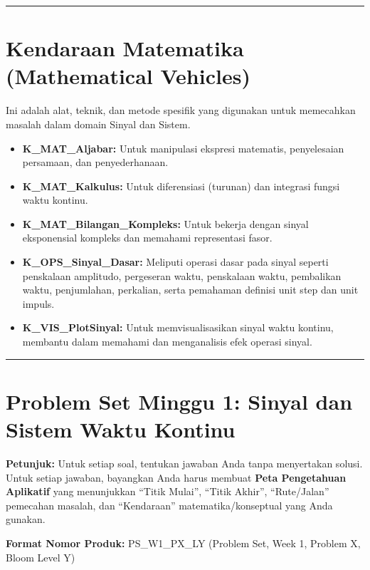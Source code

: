 \documentclass[
  letterpaper,
  DIV=11,
  numbers=noendperiod]{scrreprt}
\providecommand{\tightlist}{%
  \setlength{\itemsep}{0pt}\setlength{\parskip}{0pt}}
\begin{document}
\begin{center}\rule{0.5\linewidth}{0.5pt}\end{center}

\section{Kendaraan Matematika (Mathematical
Vehicles)}\label{kendaraan-matematika-mathematical-vehicles}

Ini adalah alat, teknik, dan metode spesifik yang digunakan untuk
memecahkan masalah dalam domain Sinyal dan Sistem.

\begin{itemize}
\tightlist
\item
  \textbf{K\_MAT\_Aljabar:} Untuk manipulasi ekspresi matematis,
  penyelesaian persamaan, dan penyederhanaan.
\item
  \textbf{K\_MAT\_Kalkulus:} Untuk diferensiasi (turunan) dan integrasi
  fungsi waktu kontinu.
\item
  \textbf{K\_MAT\_Bilangan\_Kompleks:} Untuk bekerja dengan sinyal
  eksponensial kompleks dan memahami representasi fasor.
\item
  \textbf{K\_OPS\_Sinyal\_Dasar:} Meliputi operasi dasar pada sinyal
  seperti penskalaan amplitudo, pergeseran waktu, penskalaan waktu,
  pembalikan waktu, penjumlahan, perkalian, serta pemahaman definisi
  unit step dan unit impuls.
\item
  \textbf{K\_VIS\_PlotSinyal:} Untuk memvisualisasikan sinyal waktu
  kontinu, membantu dalam memahami dan menganalisis efek operasi sinyal.
\end{itemize}

\begin{center}\rule{0.5\linewidth}{0.5pt}\end{center}

\section{Problem Set Minggu 1: Sinyal dan Sistem Waktu
Kontinu}\label{problem-set-minggu-1-sinyal-dan-sistem-waktu-kontinu}

\textbf{Petunjuk:} Untuk setiap soal, tentukan jawaban Anda tanpa
menyertakan solusi. Untuk setiap jawaban, bayangkan Anda harus membuat
\textbf{Peta Pengetahuan Aplikatif} yang menunjukkan ``Titik Mulai'',
``Titik Akhir'', ``Rute/Jalan'' pemecahan masalah, dan ``Kendaraan''
matematika/konseptual yang Anda gunakan.

\textbf{Format Nomor Produk:} PS\_W1\_PX\_LY (Problem Set, Week 1,
Problem X, Bloom Level Y)
\end{document}
